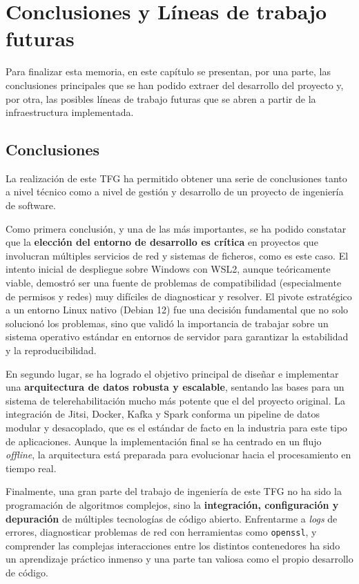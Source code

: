 \chapter{Conclusiones y Líneas de trabajo futuras}
\label{chap:conclusiones}

Para finalizar esta memoria, en este capítulo se presentan, por una parte, las conclusiones principales que se han podido extraer del desarrollo del proyecto y, por otra, las posibles líneas de trabajo futuras que se abren a partir de la infraestructura implementada.

\section{Conclusiones}

La realización de este TFG ha permitido obtener una serie de conclusiones tanto a nivel técnico como a nivel de gestión y desarrollo de un proyecto de ingeniería de software.

Como primera conclusión, y una de las más importantes, se ha podido constatar que la \textbf{elección del entorno de desarrollo es crítica} en proyectos que involucran múltiples servicios de red y sistemas de ficheros, como es este caso. El intento inicial de despliegue sobre Windows con WSL2, aunque teóricamente viable, demostró ser una fuente de problemas de compatibilidad (especialmente de permisos y redes) muy difíciles de diagnosticar y resolver. El pivote estratégico a un entorno Linux nativo (Debian 12) fue una decisión fundamental que no solo solucionó los problemas, sino que validó la importancia de trabajar sobre un sistema operativo estándar en entornos de servidor para garantizar la estabilidad y la reproducibilidad.

En segundo lugar, se ha logrado el objetivo principal de diseñar e implementar una \textbf{arquitectura de datos robusta y escalable}, sentando las bases para un sistema de telerehabilitación mucho más potente que el del proyecto original. La integración de Jitsi, Docker, Kafka y Spark conforma un pipeline de datos modular y desacoplado, que es el estándar de facto en la industria para este tipo de aplicaciones. Aunque la implementación final se ha centrado en un flujo \textit{offline}, la arquitectura está preparada para evolucionar hacia el procesamiento en tiempo real.

Finalmente, una gran parte del trabajo de ingeniería de este TFG no ha sido la programación de algoritmos complejos, sino la \textbf{integración, configuración y depuración} de múltiples tecnologías de código abierto. Enfrentarme a \textit{logs} de errores, diagnosticar problemas de red con herramientas como \texttt{openssl}, y comprender las complejas interacciones entre los distintos contenedores ha sido un aprendizaje práctico inmenso y una parte tan valiosa como el propio desarrollo de código.

